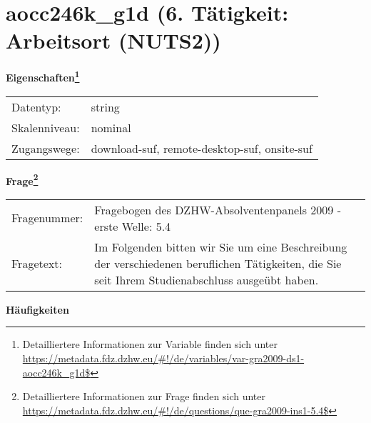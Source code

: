 
    \setcounter{footnote}{0}

    \vspace*{-1.8cm}
	\section{aocc246k\_g1d (6. Tätigkeit: Arbeitsort (NUTS2))}
	\label{section:aocc246k_g1d}



    \vspace*{0.5cm}
    \noindent\textbf{Eigenschaften\footnote{Detailliertere Informationen zur Variable finden sich unter
		\url{https://metadata.fdz.dzhw.eu/\#!/de/variables/var-gra2009-ds1-aocc246k_g1d$}}}\\
	\begin{tabularx}{\hsize}{@{}lX}
	Datentyp: & string \\
	Skalenniveau: & nominal \\
	Zugangswege: &
	  download-suf, 
	  remote-desktop-suf, 
	  onsite-suf
 \\
    \end{tabularx}



				\vspace*{0.5cm}
                \noindent\textbf{Frage\footnote{Detailliertere Informationen zur Frage finden sich unter
		              \url{https://metadata.fdz.dzhw.eu/\#!/de/questions/que-gra2009-ins1-5.4$}}}\\
				\begin{tabularx}{\hsize}{@{}lX}
					Fragenummer: &
					  Fragebogen des DZHW-Absolventenpanels 2009 - erste Welle:
					  5.4
 \\
					Fragetext: & Im Folgenden bitten wir Sie um eine Beschreibung der verschiedenen beruflichen Tätigkeiten, die Sie seit Ihrem Studienabschluss ausgeübt haben. \\
				\end{tabularx}





        		\vspace*{0.5cm}
                \noindent\textbf{Häufigkeiten}

